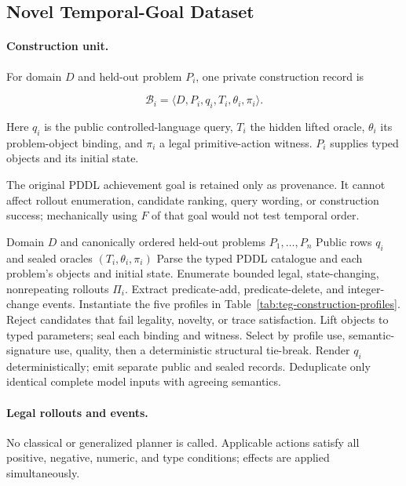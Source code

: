 \subsection{Novel Temporal-Goal Dataset}
\label{app:teg-dataset}

\paragraph{Construction unit.}
For domain $D$ and held-out problem $P_i$, one private construction record is

\[
\mathcal B_i=\langle D,P_i,q_i,T_i,\theta_i,\pi_i\rangle .
\]

Here $q_i$ is the public controlled-language query, $T_i$ the hidden lifted
\ltlf{} oracle, $\theta_i$ its problem-object binding, and $\pi_i$ a legal
primitive-action witness. $P_i$ supplies typed objects and its initial state.

The original PDDL achievement goal is retained only as provenance. It cannot
affect rollout enumeration, candidate ranking, query wording, or construction
success; mechanically using $F$ of that goal would not test temporal order.

\begin{algorithm}[htbp]
\caption{Witness-backed construction of the TEG benchmark}
\label{alg:teg-benchmark-construction}
\begin{algorithmic}[1]
\REQUIRE Domain $D$ and canonically ordered held-out problems $P_1,\ldots,P_n$
\ENSURE Public rows $q_i$ and sealed oracles $(T_i,\theta_i,\pi_i)$
\STATE Parse the typed PDDL catalogue and each problem's objects and initial state.
\STATE Enumerate bounded legal, state-changing, nonrepeating rollouts $\Pi_i$.
\STATE Extract predicate-add, predicate-delete, and integer-change events.
\STATE Instantiate the five profiles in Table~\ref{tab:teg-construction-profiles}.
\STATE Reject candidates that fail legality, novelty, or trace satisfaction.
\STATE Lift objects to typed parameters; seal each binding and witness.
\STATE Select by profile use, semantic-signature use, quality, then a deterministic structural tie-break.
\STATE Render $q_i$ deterministically; emit separate public and sealed records.
\ENDFOR
\STATE Deduplicate only identical complete model inputs with agreeing semantics.
\end{algorithmic}
\end{algorithm}

\paragraph{Legal rollouts and events.}
No classical or generalized planner is called. Applicable actions satisfy all
positive, negative, numeric, and type conditions; effects are applied
simultaneously.

